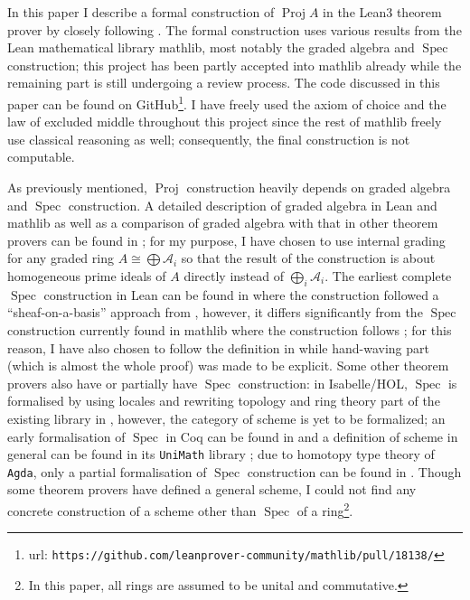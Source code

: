 \documentclass[a4paper,UKenglish,cleveref, autoref, thm-restate]{lipics-v2021}
\begin{document}
In this paper I describe a formal construction of $\operatorname{Proj} A$ in the Lean3 theorem prover \cite{de2015lean} by closely following \cite[Chapter~II]{hartshorne1977graduate}. The formal construction uses various results from the Lean mathematical library \textsf{mathlib}, most notably the graded algebra and $\operatorname{Spec}$ construction; this project has been partly accepted into \textsf{mathlib} already while the remaining part is still undergoing a review process. The code discussed in this paper can be found on GitHub\footnote{url: \texttt{https://github.com/leanprover-community/mathlib/pull/18138/}}.  I have freely used the axiom of choice and the law of excluded middle throughout this project since the rest of \textsf{mathlib} freely use classical reasoning as well; consequently, the final construction is not computable.

As previously mentioned, $\operatorname{Proj}$ construction heavily depends on graded algebra and $\operatorname{Spec}$ construction. A detailed description of graded algebra in Lean and \textsf{mathlib} as well as a comparison of graded algebra with that in other theorem provers can be found in \cite{wieser2022graded}; for my purpose, I have chosen to use internal grading for any graded ring $A \cong \bigoplus \mathcal{A}_i$ so that the result of the construction is about homogeneous prime ideals of $A$ directly instead of $\bigoplus_i \mathcal{A}_i$. The earliest complete $\operatorname{Spec}$ construction in Lean can be found in \cite{buzzard2022schemes} where the construction followed a ``sheaf-on-a-basis'' approach from \cite[\href{https://stacks.math.columbia.edu/tag/01HR}{Section 01HR}]{stacks-project}, however, it differs significantly from the $\operatorname{Spec}$ construction currently found in \textsf{mathlib} where the construction follows \cite[Chapter~II]{hartshorne1977graduate}; for this reason, I have also chosen to follow the definition in \cite[Chapter~II]{hartshorne1977graduate} while hand-waving part (which is almost the whole proof) was made to be explicit. Some other theorem provers also have or partially have $\operatorname{Spec}$ construction: in Isabelle/HOL, $\operatorname{Spec}$ is formalised by using locales and rewriting topology and ring theory part of the existing library in \cite{doi:10.1080/10586458.2022.2062073}, however, the category of scheme is yet to be formalized; an early formalisation of $\operatorname{Spec}$ in Coq can be found in \cite{chicli2001formalisation} and a definition of scheme in general can be found in its \texttt{UniMath} library \cite{UniMath}; due to homotopy type theory of \texttt{Agda}, only a partial formalisation of $\operatorname{Spec}$ construction can be found in \cite{mortbergtowards}. Though some theorem provers have defined a general scheme, I could not find any concrete construction of a scheme other than $\operatorname{Spec}$ of a ring\footnote{In this paper, all rings are assumed to be unital and commutative.}.
\end{document}
